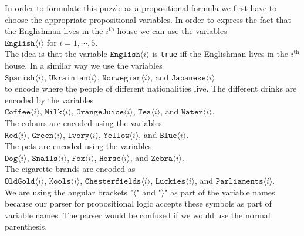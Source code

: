 In order to formulate this puzzle as a propositional formula we first have to
choose the appropriate propositional variables.  In order to express the fact
that the Englishman lives in the $i^\textrm{th}$ house we can use the variables
\\[0.2cm]
\hspace*{1.3cm}
$\texttt{English}\langle i \rangle$ \quad for $i=1,\cdots,5$.
\\[0.2cm]
The idea is that the variable $\texttt{English}\langle i \rangle$ is \texttt{true} iff the
Englishman lives in the  $i^\textrm{th}$ house.  In a similar way we use the
variables
\\[0.2cm]
\hspace*{1.3cm}
$\texttt{Spanish}\langle i \rangle$,\;
$\texttt{Ukrainian}\langle i \rangle$,\;
$\texttt{Norwegian}\langle i \rangle$,\; and 
$\texttt{Japanese}\langle i \rangle$
\\[0.2cm]
to encode where the people of different nationalities live.
The different drinks are encoded by the variables
\\[0.2cm]
\hspace*{1.3cm}
$\texttt{Coffee}\langle i \rangle$,\; $\texttt{Milk}\langle i \rangle$,\; $\texttt{OrangeJuice}\langle i \rangle$,\; $\texttt{Tea}\langle i \rangle$,\; and $\texttt{Water}\langle i \rangle$.
\\[0.2cm] 
The colours are encoded using the variables 
\\[0.2cm]
\hspace*{1.3cm}
$\texttt{Red}\langle i \rangle$,\;
$\texttt{Green}\langle i \rangle$,\;
$\texttt{Ivory}\langle i \rangle$,\;
$\texttt{Yellow}\langle i \rangle$,\; and $\texttt{Blue}\langle i \rangle$.
\\[0.2cm]
The pets are encoded using the variables
\\[0.2cm]
\hspace*{1.3cm}
$\texttt{Dog}\langle i \rangle$,\;
$\texttt{Snails}\langle i \rangle$,\;
$\texttt{Fox}\langle i \rangle$,\;
$\texttt{Horse}\langle i \rangle$,\;
and $\texttt{Zebra}\langle i \rangle$.
\\[0.2cm]
The cigarette brands are encoded as
\\[0.2cm]
\hspace*{1.3cm}
$\texttt{OldGold}\langle i \rangle$,\; $\texttt{Kools}\langle i \rangle$,\;
$\texttt{Chesterfields}\langle i \rangle$,\; $\texttt{Luckies}\langle i \rangle$,\; and
$\texttt{Parliaments}\langle i \rangle$.
\\[0.2cm]
We are using the angular brackets "$\langle$" and "$\rangle$" as part of the
variable names because our parser for propositional logic accepts these symbols
as part of variable names.  The parser would be confused if we would use the
normal parenthesis.  

